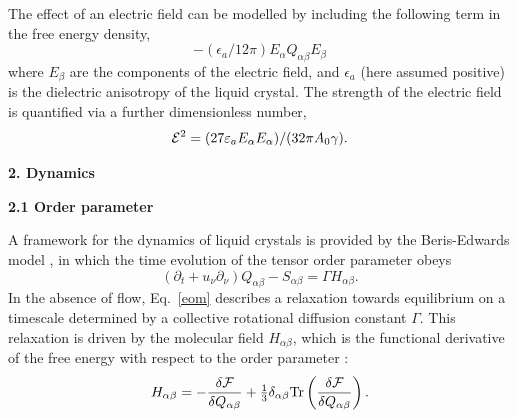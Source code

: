 \documentclass[12pt,twoside]{article}
\begin{document}
The effect of an electric field can be modelled by including the following
term in the free energy density,
\begin{equation}
-(\epsilon_a/12\pi)E_{\alpha}Q_{\alpha\beta}E_{\beta}
\end{equation} 
where $E_{\beta}$ are the components of the electric field, and 
$\epsilon_a$ (here assumed positive) is the dielectric anisotropy of the liquid
crystal. The strength of the electric field is quantified via
a further dimensionless number, 
\begin{equation}
{\cal E}^2=(27 \varepsilon_a E_\alpha E_\alpha)/(32 \pi A_0 \gamma).
\end{equation}


{\bf 2. Dynamics}

{\bf 2.1 Order parameter}

A framework for the dynamics of liquid crystals is provided by the 
Beris-Edwards model \cite{beris}, in which the time evolution of the
tensor order parameter obeys
\begin{equation}
\label{eom}
\left(\partial_t+ u_\nu \partial_\nu \right) Q_{\alpha\beta} - S_{\alpha\beta}
= \Gamma H_{\alpha\beta}.
\end{equation}
In the absence of flow, Eq.~\ref{eom} describes a relaxation towards
equilibrium on a timescale determined by a collective rotational diffusion 
constant $\Gamma$. This relaxation is driven by the molecular field
$H_{\alpha\beta}$, which is the functional derivative of the free energy
with respect to the order parameter \cite{beris}:
\begin{equation}
H_{\alpha\beta} = -\frac{\delta {\cal F}} {\delta Q_{\alpha\beta}} 
+ {\textstyle \frac{1}{3}} \delta_{\alpha\beta} 
\mathrm{Tr}\left(\frac{\delta {\cal F}}{\delta Q_{\alpha\beta}}\right).
\end{equation}
\end{document}
